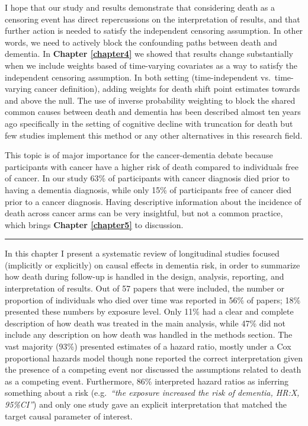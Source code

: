 \documentclass[
]{book}
\begin{document}
I hope that our study and results demonstrate that considering death as a censoring event has direct repercussions on the interpretation of results, and that further action is needed to satisfy the independent censoring assumption. In other words, we need to actively block the confounding paths between death and dementia. In \textbf{Chapter \ref{chapter4}} we showed that results change substantially when we include weights based of time-varying covariates as a way to satisfy the independent censoring assumption. In both setting (time-independent vs.~time-varying cancer definition), adding weights for death shift point estimates towards and above the null. The use of inverse probability weighting to block the shared common causes between death and dementia has been described almost ten years ago specifically in the setting of cognitive decline with truncation for death\autocite{weuve2012} but few studies implement this method or any other alternatives\autocite{vangeloven2014} in this research field.

This topic is of major importance for the cancer-dementia debate because participants with cancer have a higher risk of death compared to individuals free of cancer. In our study 63\% of participants with cancer diagnosis died prior to having a dementia diagnosis, while only 15\% of participants free of cancer died prior to a cancer diagnosis. Having descriptive information about the incidence of death across cancer arms can be very insightful, but not a common practice, which brings \textbf{Chapter \ref{chapter5}} to discussion.

\begin{center}\rule{0.5\linewidth}{0.5pt}\end{center}

In this chapter I present a systematic review of longitudinal studies focused (implicitly or explicitly) on causal effects in dementia risk, in order to summarize how death during follow-up is handled in the design, analysis, reporting, and interpretation of results. Out of 57 papers that were included, the number or proportion of individuals who died over time was reported in 56\% of papers; 18\% presented these numbers by exposure level. Only 11\% had a clear and complete description of how death was treated in the main analysis, while 47\% did not include any description on how death was handled in the methods section. The vast majority (93\%) presented estimates of a hazard ratio, mostly under a Cox proportional hazards model though none reported the correct interpretation given the presence of a competing event nor discussed the assumptions related to death as a competing event. Furthermore, 86\% interpreted hazard ratios as inferring something about a risk (e.g.~\emph{``the exposure increased the risk of dementia, HR:X, 95\%CI''}) and only one study gave an explicit interpretation that matched the target causal parameter of interest.
\end{document}
